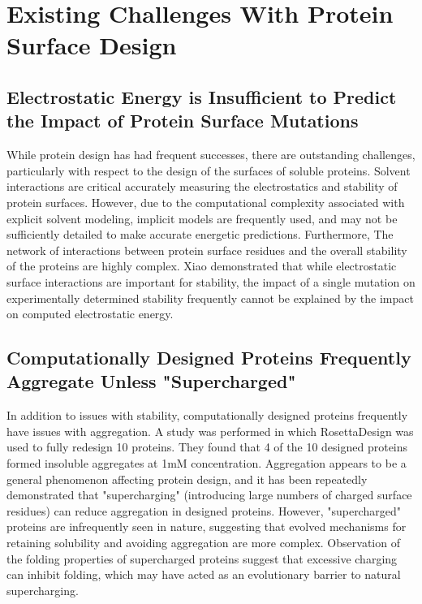 \section{Existing Challenges With Protein Surface Design}

\subsection{Electrostatic Energy is Insufficient to Predict the Impact of Protein Surface Mutations}
While protein design has had frequent successes, there are outstanding challenges, particularly with respect to the design of the surfaces of soluble proteins.
Solvent interactions are critical accurately measuring the electrostatics and stability of protein surfaces\citep{Park:2004kn}.
However, due to the computational complexity associated with explicit solvent modeling, implicit models are frequently used, and may not be sufficiently detailed to make accurate energetic predictions.
Furthermore, The network of interactions between protein surface residues and the overall stability of the proteins are highly complex. 
Xiao\citep{Xiao:2013dq} demonstrated that while electrostatic surface interactions are important for stability, the impact of a single mutation on experimentally determined stability frequently cannot be explained by the impact on computed electrostatic energy.

\subsection{Computationally Designed Proteins Frequently Aggregate Unless "Supercharged"}
In addition to issues with stability, computationally designed proteins frequently have issues with aggregation.
A study was performed in which RosettaDesign was used to fully redesign 10 proteins\citep{Dantas:2003vt}.
They found that 4 of the 10 designed proteins formed insoluble aggregates at 1mM concentration.
Aggregation appears to be a general phenomenon affecting protein design, and it has been repeatedly demonstrated that "supercharging" (introducing large numbers of charged surface residues)\citep{Simeonov:2011jf,Kurnik:2012dz,MichaelSLawrence:2007cv} can reduce aggregation in designed proteins.
However, "supercharged" proteins are infrequently seen in nature, suggesting that evolved mechanisms for retaining solubility and avoiding aggregation are more complex.
Observation of the folding properties of supercharged proteins suggest that excessive charging can inhibit folding\citep{MichaelSLawrence:2007cv}, which may have acted as an evolutionary  barrier to natural supercharging.

